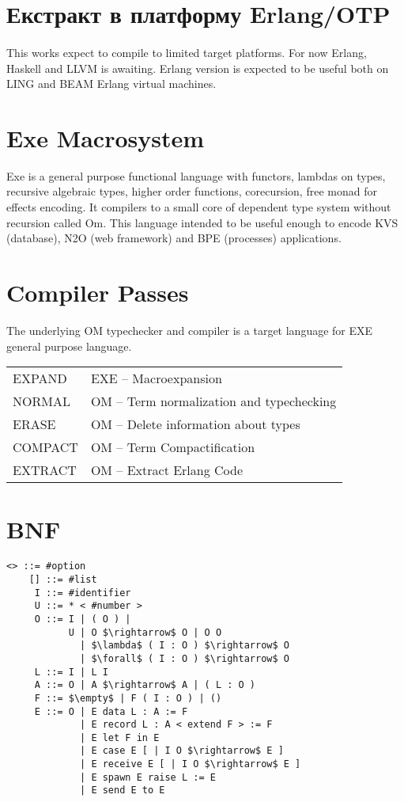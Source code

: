 \section{Екстракт в платформу Erlang/OTP}

   \paragraph{}
   This works expect to compile to limited target platforms. For now Erlang, Haskell and LLVM is awaiting.
   Erlang version is expected to be useful both on LING and BEAM Erlang virtual machines.

\newpage
   \section*{Exe Macrosystem}

   Exe is a general purpose functional language with functors, lambdas on types, recursive algebraic types,
   higher order functions, corecursion, free monad for effects encoding. It compilers
   to a small core of dependent type system without recursion called Om.
   This language intended to be useful enough to encode KVS (database), N2O (web framework) and
   BPE (processes) applications.

   \section*{Compiler Passes}

   The underlying OM typechecker and compiler is a target language for EXE general purpose language.
   \begin{center}
   \begin{tabular}{ll}
   EXPAND  & EXE -- Macroexpansion\\
   NORMAL  & OM -- Term normalization and typechecking\\
   ERASE   & OM -- Delete information about types\\
   COMPACT & OM -- Term Compactification\\
   EXTRACT & OM -- Extract Erlang Code\\
   \end{tabular}
   \end{center}

   \section*{BNF}

\begin{lstlisting}[mathescape=true]
    <> ::= #option
    [] ::= #list
     I ::= #identifier
     U ::= * < #number >
     O ::= I | ( O ) |
           U | O $\rightarrow$ O | O O
             | $\lambda$ ( I : O ) $\rightarrow$ O
             | $\forall$ ( I : O ) $\rightarrow$ O
     L ::= I | L I
     A ::= O | A $\rightarrow$ A | ( L : O )
     F ::= $\empty$ | F ( I : O ) | ()
     E ::= O | E data L : A := F
             | E record L : A < extend F > := F
             | E let F in E
             | E case E [ | I O $\rightarrow$ E ]
             | E receive E [ | I O $\rightarrow$ E ]
             | E spawn E raise L := E
             | E send E to E
\end{lstlisting}


